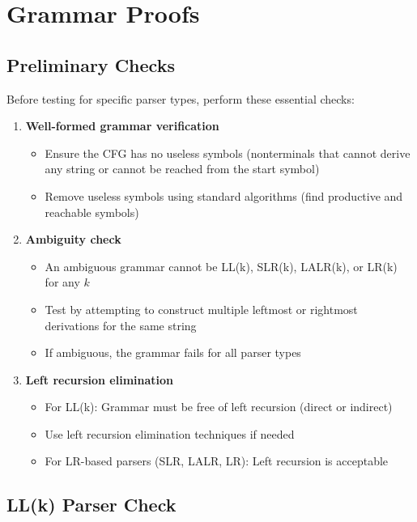 
\section{Grammar Proofs}

\subsection{Preliminary Checks}

Before testing for specific parser types, perform these essential checks:

\begin{enumerate}
    \item \textbf{Well-formed grammar verification}
    \begin{itemize}
        \item Ensure the CFG has no useless symbols (nonterminals that cannot derive any string or cannot be reached from the start symbol)
        \item Remove useless symbols using standard algorithms (find productive and reachable symbols)
    \end{itemize}
    
    \item \textbf{Ambiguity check}
    \begin{itemize}
        \item An ambiguous grammar cannot be LL(k), SLR(k), LALR(k), or LR(k) for any $k$
        \item Test by attempting to construct multiple leftmost or rightmost derivations for the same string
        \item If ambiguous, the grammar fails for all parser types
    \end{itemize}
    
    \item \textbf{Left recursion elimination}
    \begin{itemize}
        \item For LL(k): Grammar must be free of left recursion (direct or indirect)
        \item Use left recursion elimination techniques if needed
        \item For LR-based parsers (SLR, LALR, LR): Left recursion is acceptable
    \end{itemize}
\end{enumerate}

\subsection{LL(k) Parser Check}

